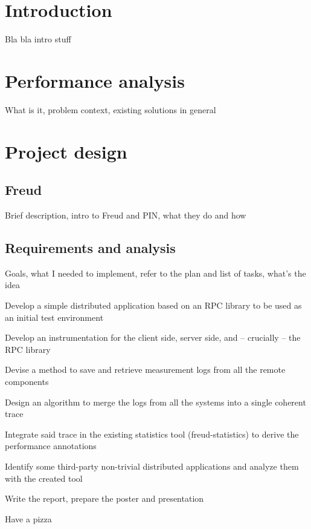 \chapter{Introduction}

    Bla bla intro stuff


\chapter{Performance analysis}

    What is it, problem context, existing solutions in general


\chapter{Project design}

    \section{Freud}

        Brief description, intro to Freud and PIN, what they do and how

    \section{Requirements and analysis}

        Goals, what I needed to implement, refer to the plan and list of tasks, what's the idea

        Develop a simple distributed application based on an RPC library to be used as an initial test environment

        Develop an instrumentation for the client side, server side, and – crucially – the RPC library

        Devise a method to save and retrieve measurement logs from all the remote components

        Design an algorithm to merge the logs from all the systems into a single coherent trace

        Integrate said trace in the existing statistics tool (freud-statistics) to derive the performance annotations

        Identify some third-party non-trivial distributed applications and analyze them with the created tool

        Write the report, prepare the poster and presentation
        
        Have a pizza
        

